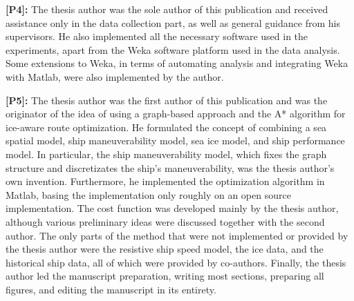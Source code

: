 \textbf{[P4]:} The thesis author was the sole author of this publication and received assistance only in the data collection part, as well as general guidance from his supervisors. He also implemented all the necessary software used in the experiments, apart from the Weka software platform used in the data analysis. Some extensions to Weka, in terms of automating analysis and integrating Weka with Matlab, were also implemented by the author.

\textbf{[P5]:} The thesis author was the first author of this publication and was the originator of the idea of using a graph-based approach and the A* algorithm for ice-aware route optimization. He formulated the concept of combining a sea spatial model, ship maneuverability model, sea ice model, and ship performance model. In particular, the ship maneuverability model, which fixes the graph structure and discretizates the ship's maneuverability, was the thesis author's own invention. Furthermore, he implemented the optimization algorithm in Matlab, basing the implementation only roughly on an open source implementation.  The cost function was developed mainly by the thesis author, although various preliminary ideas were discussed together with the second author. The only parts of the method that were not implemented or provided by the thesis author were the resistive ship speed model, the ice data, and the historical ship data, all of which were provided by co-authors. Finally, the thesis author led the manuscript preparation, writing most sections, preparing all figures, and editing the manuscript in its entirety.